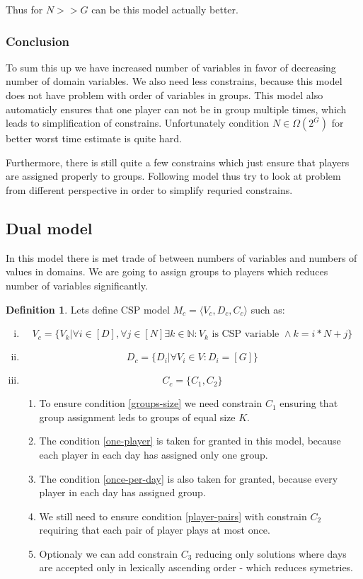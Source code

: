 \documentclass[a4paper]{article}
\theoremstyle{definition}
\newtheorem{definition}{Definition}[section]
\theoremstyle{remark}
\newcommand{\mdef}[2]{
	\theoremstyle{definition}
	\begin{definition}{#1}
	#2
	\end{definition}
}
\begin{document}
Thus for $N >> G$ can be this model actually better.

\subsubsection{Conclusion}
To sum this up we have increased number of variables in favor of decreasing number of domain variables.
We also need less constrains, because this model does not have problem with order of
variables in groups. This model also automaticly ensures that one player
can not be in group multiple times, which leads to simplification of constrains.
Unfortunately condition $N \in \Omega(2^G)$ for better worst time estimate is quite hard.

Furthermore, there is still quite a few constrains which just ensure that players
are assigned properly to groups. Following model thus try to look at problem from
different perspective in order to simplify requried constrains.

\subsection{Dual model}
In this model there is met trade of between numbers of variables and numbers of values in domains.
We are going to assign groups to players which reduces number of variables significantly.

\mdef{}{ Lets define CSP model $M_c = \langle V_c,D_c,C_c \rangle$ such as:
	\begin{enumerate}[(i)]
		\item $$ V_c = \{V_k|  \forall i \in [D], \forall j \in [N] \exists k \in \mathbb{N}: V_k \text{ is CSP variable } \land  k=i*N+j \} $$
		\item $$ D_c = \{D_i| \forall V_i \in V: D_i = [G] \} $$
		\item $$ C_c = \{ C_1, C_2\} $$
		\begin{enumerate}
			\item To ensure condition \ref{groups-size} we need constrain $C_1$ ensuring that group assignment leds to 
			groups of equal size $K$.
			\item The condition \ref{one-player} is taken for granted in this model, because each player in each day has assigned only one group.
			\item The condition \ref{once-per-day} is also taken for granted, because every player  in each day has assigned group.
			\item We still need to ensure condition \ref{player-pairs} with constrain $C_2$ requiring that each pair of player plays at most once.
			\item Optionaly we can add constrain $C_3$ reducing only solutions where days are accepted only in lexically ascending order - which reduces symetries.
		\end{enumerate}
	\end{enumerate}
}
\end{document}

